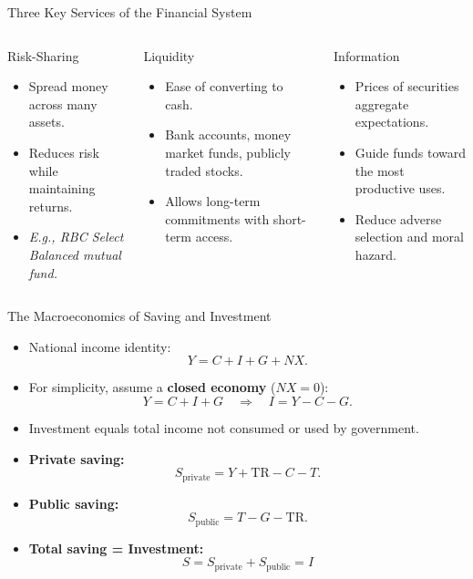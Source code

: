 \documentclass[aspectratio=169]{beamer}
\begin{document}
\begin{frame}{Three Key Services of the Financial System}
\transfade
\begin{columns}
\begin{block}{\centering \textcolor{accent}{Risk-Sharing}}
\begin{itemize}
  \item Spread money across many assets.
  \item Reduces risk while maintaining returns.
  \item \textit{E.g., RBC Select Balanced mutual fund.}
\end{itemize}
\end{block}
\begin{block}{\centering \textcolor{leafgreen}{Liquidity}}
\begin{itemize}
  \item Ease of converting to cash.
  \item Bank accounts, money market funds, publicly traded stocks.
  \item Allows long-term commitments with short-term access.
\end{itemize}
\end{block}
\begin{block}{\centering \textcolor{deeporange}{Information}}
\begin{itemize}
  \item Prices of securities aggregate expectations.
  \item Guide funds toward the most productive uses.
  \item Reduce adverse selection and moral hazard.
\end{itemize}
\end{block}
\end{columns}
\end{frame}


\begin{frame}{The Macroeconomics of Saving and Investment}
\transfade
\begin{itemize}[<+->]
  \item National income identity:
  \[
    Y = C + I + G + NX.
  \]
  \item For simplicity, assume a \textbf{closed economy} ($NX = 0$):
  \[
    Y = C + I + G \quad \Rightarrow \quad I = Y - C - G.
  \]
  \item Investment equals total income not consumed or used by government.
  \item \textbf{Private saving:}
  \[
    S_{\text{private}} = Y + \text{TR} - C - T.
  \]
  \item \textbf{Public saving:}
  \[
    S_{\text{public}} = T - G - \text{TR}.
  \]
  \item \textbf{Total saving = Investment:}
  \[
    \boxed{S = S_{\text{private}} + S_{\text{public}} = I}
  \]
\end{itemize}
\end{frame}
\end{document}

